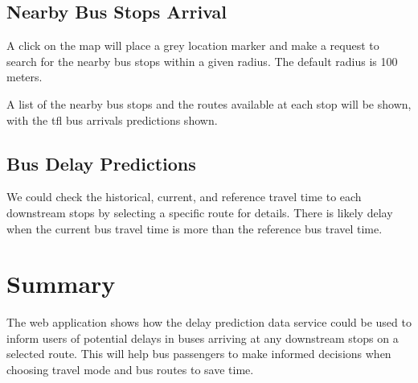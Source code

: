 \subsection{Nearby Bus Stops Arrival}
\par A click on the map will place a grey location marker and make a request to search for the nearby bus stops within a given radius. The default radius is 100 meters.

\par A list of the nearby bus stops and the routes available at each stop will be shown, with the \acrshort{tfl} bus arrivals predictions shown.

\subsection{Bus Delay Predictions}
\par We could check the historical, current, and reference travel time to each downstream stops by selecting a specific route for details. There is likely delay when the current bus travel time is more than the reference bus travel time.

\section{Summary}
\par The web application shows how the delay prediction data service could be used to inform users of potential delays in buses arriving at any downstream stops on a selected route. This will help bus passengers to make informed decisions when choosing travel mode and bus routes to save time.

